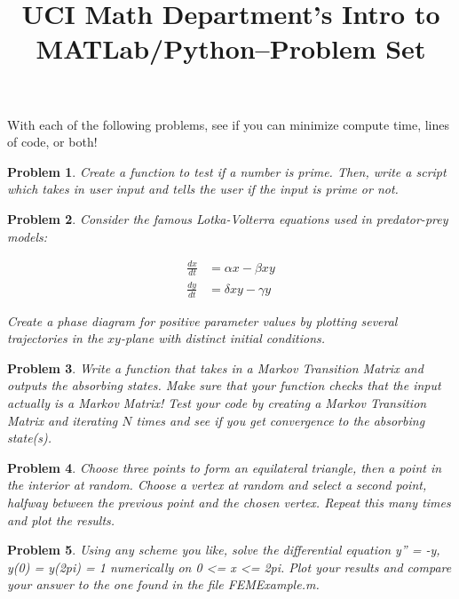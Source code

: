 \documentclass{article}
\newtheorem{problem}{Problem}
\begin{document}
\title{UCI Math Department's Intro to MATLab/Python--Problem Set}
\maketitle

With each of the following problems, see if you can minimize compute time, lines of code, or both!

\begin{problem}
Create a function to test if a number is prime. Then, write a script which takes in user input and tells the user if the input is prime or not.
\end{problem}

\begin{problem}
Consider the famous Lotka-Volterra equations used in predator-prey models:

\begin{align*}
\frac{dx}{dt} & = \alpha x - \beta xy \\
\frac{dy}{dt} & = \delta xy - \gamma y
\end{align*}

Create a phase diagram for positive parameter values by plotting several trajectories in the $xy$-plane with distinct initial conditions.

\end{problem}

\begin{problem}

Write a function that takes in a Markov Transition Matrix and outputs the absorbing states.
Make sure that your function checks that the input actually is a Markov Matrix!
Test your code by creating a Markov Transition Matrix and iterating $N$ times and see if you get convergence to the absorbing state(s).

\end{problem}

\begin{problem}

Choose three points to form an equilateral triangle, then a point in the interior at random.  Choose a vertex at random and select a second point, halfway between the previous point and the chosen vertex.  Repeat this many times and plot the results.

\end{problem}

\begin{problem}

Using any scheme you like, solve the differential equation y'' = -y, y(0) = y(2pi) = 1 numerically on 0 <= x <= 2pi.  Plot your results and compare your answer to the one found in the file FEMExample.m.

\end{problem}
\end{document}
